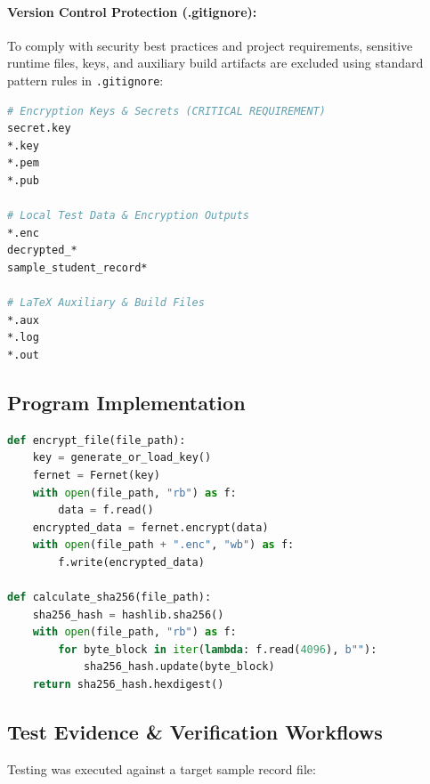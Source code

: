 \documentclass[12pt,a4paper]{article}
\begin{document}
\paragraph{Version Control Protection (.gitignore):}
To comply with security best practices and project requirements, sensitive runtime files, keys, and auxiliary build artifacts are excluded using standard pattern rules in \texttt{.gitignore}:

\begin{lstlisting}[language=bash, caption={Repository Security Rules in .gitignore}]
# Encryption Keys & Secrets (CRITICAL REQUIREMENT)
secret.key
*.key
*.pem
*.pub

# Local Test Data & Encryption Outputs
*.enc
decrypted_*
sample_student_record*

# LaTeX Auxiliary & Build Files
*.aux
*.log
*.out
\end{lstlisting}

\subsection{Program Implementation}
\begin{lstlisting}[language=Python, caption={Core Functions of security\_toolkit.py}]
def encrypt_file(file_path):
    key = generate_or_load_key()
    fernet = Fernet(key)
    with open(file_path, "rb") as f:
        data = f.read()
    encrypted_data = fernet.encrypt(data)
    with open(file_path + ".enc", "wb") as f:
        f.write(encrypted_data)

def calculate_sha256(file_path):
    sha256_hash = hashlib.sha256()
    with open(file_path, "rb") as f:
        for byte_block in iter(lambda: f.read(4096), b""):
            sha256_hash.update(byte_block)
    return sha256_hash.hexdigest()
\end{lstlisting}

\subsection{Test Evidence \& Verification Workflows}
Testing was executed against a target sample record file:
\end{document}
